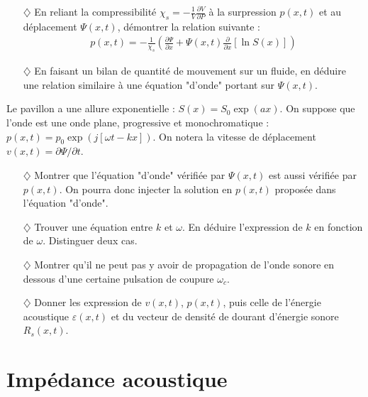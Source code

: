 \documentclass{report}
\begin{document}
\begin{itemize}

\item[$\diamondsuit$] En reliant la compressibilité $\chi_s=-\frac{1}{V}\frac{\partial V}{\partial P}$ à la surpression $p(x,t)$ et au déplacement $\Psi(x,t)$, démontrer la relation suivante :
\begin{align*}
	p(x,t) = -\frac{1}{\chi_s}\left(\frac{\partial \Psi}{\partial x}+\Psi(x,t)\frac{\partial }{\partial x}\left[\ln S(x) \right]  \right)
\end{align*}

\item[$\diamondsuit$] En faisant un bilan de quantité de mouvement sur un fluide, en déduire une relation similaire à une équation "d'onde" portant sur $\Psi(x,t)$.

\end{itemize}

Le pavillon a une allure exponentielle : $S(x)=S_0\exp(ax)$. On suppose que l'onde est une onde plane, progressive et monochromatique : $p(x,t)=p_0\exp\left(j[\omega t-kx] \right)$. On notera la vitesse de déplacement $v(x,t)=\partial\Psi/\partial t$.

\begin{itemize}

\item[$\diamondsuit$] Montrer que l'équation "d'onde" vérifiée par $\Psi(x,t)$ est aussi vérifiée par $p(x,t)$. On pourra donc injecter la solution en $p(x,t)$ proposée dans l'équation "d'onde".

\item[$\diamondsuit$]  Trouver une équation entre $k$ et $\omega$. En déduire l'expression de $k$ en fonction de $\omega$. Distinguer deux cas.

\item[$\diamondsuit$] Montrer qu'il ne peut pas y avoir de propagation de l'onde sonore en dessous d'une certaine pulsation de coupure $\omega_c$.

\item[$\diamondsuit$] Donner les expression de $v(x,t)$, $p(x,t)$, puis celle de l'énergie acoustique $\varepsilon(x,t)$ et du vecteur de densité de dourant d'énergie sonore $R_s(x,t)$.

\end{itemize}

\newpage

\section*{Impédance acoustique}
\end{document}
